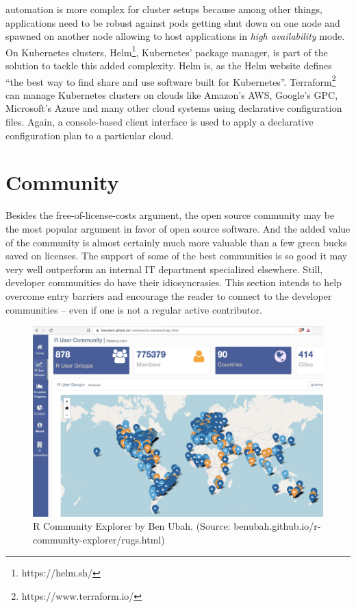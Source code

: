\documentclass[
  12pt,
  letterpaper,
]{krantz}
\begin{document}
automation is more complex for cluster setups because
among other things, applications need to be robust against pods getting
shut down on one node and spawned on another node allowing to host
applications in \emph{high availability} mode. On Kubernetes clusters,
Helm\footnote{https://helm.sh/}, Kubernetes' package manager, is part of
the solution to tackle this added complexity. Helm is, as the Helm
website defines ``the best way to find share and use software built for
Kubernetes''. Terraform\footnote{https://www.terraform.io/} can manage
Kubernetes clusters on clouds like Amazon's AWS, Google's GPC,
Microsoft's Azure and many other cloud systems using declarative
configuration files. Again, a console-based client interface is used to
apply a declarative configuration plan to a particular cloud.


\hypertarget{community}{%
\chapter{Community}\label{community}}

Besides the free-of-license-costs argument, the open source community
may be the most popular argument in favor of open source software. And
the added value of the community is almost certainly much more valuable
than a few green bucks saved on licenses. The support of some of the
best communities is so good it may very well outperform an internal IT
department specialized elsewhere. Still, developer communities do have
their idiosyncrasies. This section intends to help overcome entry
barriers and encourage the reader to connect to the developer
communities -- even if one is not a regular active contributor.

\begin{figure}

{\centering \includegraphics{./images/community_explorer.png}

}

\caption{R Community Explorer by Ben Ubah. (Source:
benubah.github.io/r-community-explorer/rugs.html)}

\end{figure}
\end{document}
